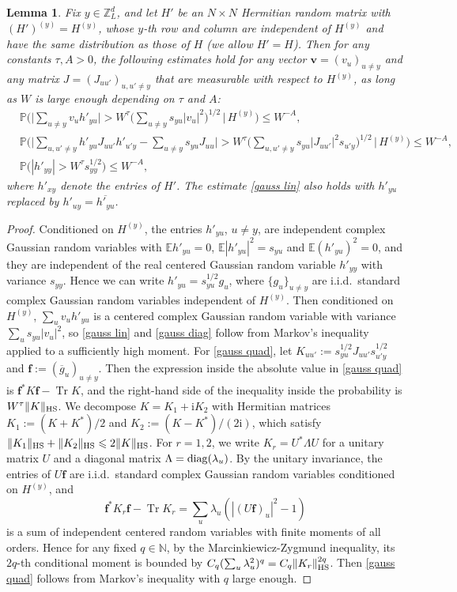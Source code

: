\documentclass{article}
\newcommand{\1}{\mathds{1}}
\numberwithin{equation}{section}
\newcommand{\ii}{\mathrm{i}} %
\renewcommand{\leq}{\leqslant}
\renewcommand{\le}{\leq}
\renewcommand{\P}{\mathbb{P}}
\newcommand{\E}{\mathbb{E}}
\newcommand{\N}{\mathbb{N}}
\newcommand{\Z}{\mathbb{Z}}
\DeclareMathOperator{\tr}{Tr}
\theoremstyle{plain} %
\newtheorem{lemma}[theorem]{Lemma}
\theoremstyle{remark}
\begin{document}
\begin{lemma}\label{lem gauss}
Fix $y\in \Z_L^d$, and let $H'$ be an $N\times N$ Hermitian random matrix with $(H')^{(y)}=H^{(y)}$, whose $y$-th row and column are independent of $H^{(y)}$ and have the same distribution as those of $H$ (we allow $H'=H$). Then for any constants $\tau,A>0$, the following estimates hold for any vector $\mathbf v=(v_u)_{u\ne y}$ and any matrix $J=(J_{uu'})_{u,u'\ne y}$ that are measurable with respect to $H^{(y)}$, as long as $W$ is large enough depending on $\tau$ and $A$:
\begin{align}
&\P\Big(\Big|\sum_{u\ne y}v_u h'_{yu}\Big|> W^{\tau}\Big(\sum_{u\ne y}s_{yu}|v_u|^2\Big)^{1/2}\,\Big|\, H^{(y)}\Big)\le W^{-A},\label{gauss lin}\\
&\P\Big(\Big|\sum_{u,u'\ne y}h'_{yu}J_{uu'}h'_{u'y}-\sum_{u\ne y}s_{yu}J_{uu}\Big|> W^{\tau}\Big(\sum_{u,u'\ne y}s_{yu}|J_{uu'}|^2s_{u'y}\Big)^{1/2}\,\Big|\, H^{(y)}\Big)\le W^{-A},\label{gauss quad}\\
&\P\Big(|h'_{yy}|>W^\tau s_{yy}^{1/2}\Big)\le W^{-A},\label{gauss diag}
\end{align}
where $h'_{xy}$ denote the entries of $H'$. The estimate \eqref{gauss lin} also holds with $h'_{yu}$ replaced by $h'_{uy}=\overline{h'_{yu}}$.
\end{lemma}
\begin{proof}
Conditioned on $H^{(y)}$, the entries $h'_{yu}$, $u\ne y$, are independent complex Gaussian random variables with $\E h'_{yu}=0$, $\E|h'_{yu}|^2=s_{yu}$ and $\E (h'_{yu})^2=0$, and they are independent of the real centered Gaussian random variable $h'_{yy}$ with variance $s_{yy}$. Hence we can write $h'_{yu}=s_{yu}^{1/2}g_u$, where $\{g_u\}_{u\ne y}$ are i.i.d.~standard complex Gaussian random variables independent of $H^{(y)}$. Then conditioned on $H^{(y)}$, $\sum_u v_uh'_{yu}$ is a centered complex Gaussian random variable with variance $\sum_u s_{yu}|v_u|^2$, so \eqref{gauss lin} and \eqref{gauss diag} follow from Markov's inequality applied to a sufficiently high moment. For \eqref{gauss quad}, let $K_{uu'}:=s_{yu}^{1/2}J_{uu'}s_{u'y}^{1/2}$ and $\mathbf f:=(\overline g_u)_{u\ne y}$. Then the expression inside the absolute value in \eqref{gauss quad} is $\mathbf f^*K\mathbf f-\tr K$, and the right-hand side of the inequality inside the probability is $W^\tau\|K\|_{\rm HS}$. We decompose $K=K_1+\ii K_2$ with Hermitian matrices $K_1:=(K+K^*)/2$ and $K_2:=(K-K^*)/(2\ii)$, which satisfy $\|K_1\|_{\rm HS}+\|K_2\|_{\rm HS}\le 2\|K\|_{\rm HS}$. For $r=1,2$, we write $K_r=U^*\Lambda U$ for a unitary matrix $U$ and a diagonal matrix $\Lambda={\rm diag}(\lambda_u)$. By the unitary invariance, the entries of $U\mathbf f$ are i.i.d.~standard complex Gaussian random variables conditioned on $H^{(y)}$, and
$$\mathbf f^*K_r\mathbf f-\tr K_r=\sum_u \lambda_u\left(|(U\mathbf f)_u|^2-1\right)$$
is a sum of independent centered random variables with finite moments of all orders. Hence for any fixed $q\in\N$, by the Marcinkiewicz-Zygmund inequality, its $2q$-th conditional moment is bounded by $C_q(\sum_u\lambda_u^2)^q=C_q\|K_r\|_{\rm HS}^{2q}$. Then \eqref{gauss quad} follows from Markov's inequality with $q$ large enough.
\end{proof}
\end{document}
